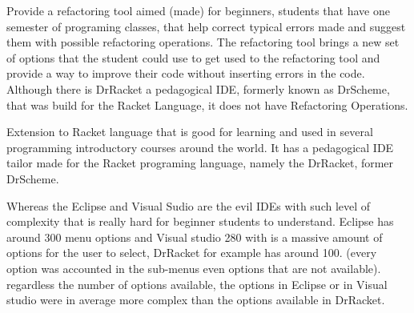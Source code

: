 
Provide a refactoring tool aimed (made) for beginners, students that have one semester
of programing classes, that help correct typical errors made and suggest them
with possible refactoring operations.
The refactoring tool brings a new set of options that the student could use to
get used to the refactoring tool and provide a way to improve their code without
inserting errors in the code.
Although there is DrRacket a pedagogical IDE, formerly known as DrScheme, that was
build for the Racket Language, it does not have Refactoring Operations.

Extension to Racket language that is good for learning and used in several
programming introductory courses around the world.
It has a pedagogical IDE tailor made for the Racket programing language, namely
the DrRacket, former DrScheme.



Whereas the Eclipse and Visual Sudio are the evil IDEs with such level of
complexity that is really hard for beginner students to understand.
Eclipse has around 300 menu options and Visual studio 280 with is a massive amount
of options for the user to select, DrRacket for example has around 100. (every option was accounted in the sub-menus
even options that are not available). regardless the number of options available,
the options in Eclipse or in Visual studio were in average more complex than the
options available in DrRacket.
